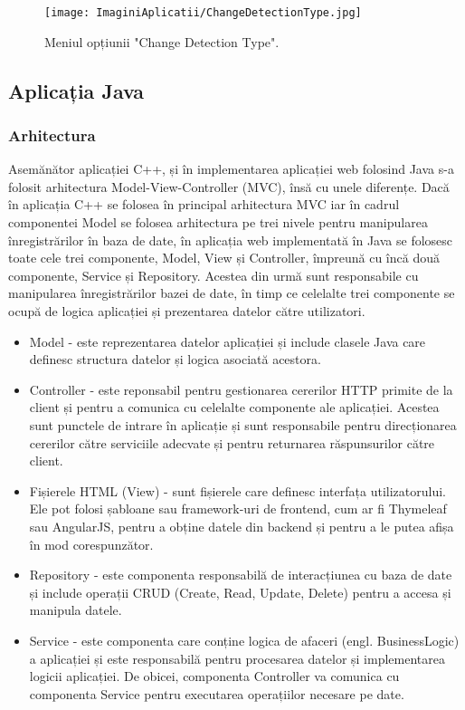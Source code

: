 \documentclass[12pt]{article}
\begin{document}
\begin{figure}[H]
  \centering
  \texttt{[image: ImaginiAplicatii/ChangeDetectionType.jpg]}
  \caption{Meniul opțiunii "Change Detection Type".}
  \label{fig:aplicatie_change_detection}
\end{figure}

\subsection{Aplicația Java}

\subsubsection{Arhitectura}

Asem\u{a}n\u{a}tor aplicației C++, și \^{i}n implementarea aplicației web folosind Java s-a folosit arhitectura Model-View-Controller (MVC), \^{i}ns\u{a} cu unele diferențe. Dac\u{a} \^{i}n aplicația C++ se folosea \^{i}n principal arhitectura MVC iar \^{i}n cadrul componentei Model se folosea arhitectura pe trei nivele pentru manipularea \^{i}nregistr\u{a}rilor \^{i}n baza de date, \^{i}n aplicația web implementat\u{a} \^{i}n Java se folosesc toate cele trei componente, Model, View și Controller, \^{i}mpreun\u{a} cu \^{i}nc\u{a} dou\u{a} componente, Service și Repository. Acestea din urm\u{a} sunt responsabile cu manipularea \^{i}nregistr\u{a}rilor bazei de date, \^{i}n timp ce celelalte trei componente se ocup\u{a} de logica aplicației și prezentarea datelor c\u{a}tre utilizatori.

\begin{itemize}
    \item Model - este reprezentarea datelor aplicației și include clasele Java care definesc structura datelor și logica asociat\u{a} acestora.
    \item Controller - este reponsabil pentru gestionarea cererilor HTTP primite de la client și pentru a comunica cu celelalte componente ale aplicației. Acestea sunt punctele de intrare \^{i}n aplicație și sunt responsabile pentru direcționarea cererilor c\u{a}tre serviciile adecvate și pentru returnarea r\u{a}spunsurilor c\u{a}tre client.
    \item Fișierele HTML (View) - sunt fișierele care definesc interfața utilizatorului. Ele pot folosi șabloane sau framework-uri de frontend, cum ar fi Thymeleaf sau AngularJS, pentru a obține datele din backend și pentru a le putea afișa \^{i}n mod corespunz\u{a}tor.
    \item Repository - este componenta responsabil\u{a} de interacțiunea cu baza de date și include operații CRUD (Create, Read, Update, Delete) pentru a accesa și manipula datele.
    \item Service - este componenta care conține logica de afaceri (engl. BusinessLogic) a aplicației și este responsabil\u{a} pentru procesarea datelor și implementarea logicii aplicației. De obicei, componenta Controller va comunica cu componenta Service pentru executarea operațiilor necesare pe date.
\end{itemize}
\end{document}

